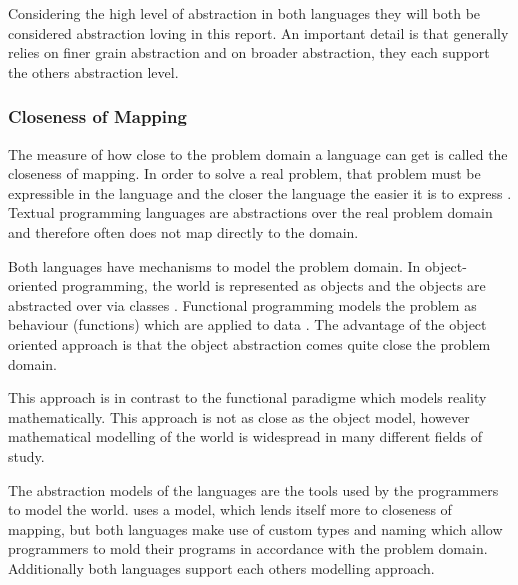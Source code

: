 Considering the high level of abstraction in both languages they will both be considered abstraction loving in this report. An important detail is that \fs generally relies on finer grain abstraction and \cs on broader abstraction, they each support the others abstraction level.

\subsubsection{Closeness of Mapping}
The measure of how close to the problem domain a language can get is called the closeness of mapping. In order to solve a real problem, that problem must be expressible in the language and the closer the language the easier it is to express \cite{green1996usability}. Textual programming languages are abstractions over the real problem domain and therefore often does not map directly to the domain.

Both languages have mechanisms to model the problem domain. In object-oriented programming, the world is represented as objects and the objects are abstracted over via classes \cite{kindler2011object}. Functional programming models the problem as behaviour (functions) which are applied to data \cite{hughes1989functional}. The advantage of the object oriented approach is that the object abstraction comes quite close the problem domain.


This approach is in contrast to the functional paradigme which models reality mathematically. This approach is not as close as the object model, however mathematical modelling of the world is widespread in many different fields of study.


The abstraction models of the languages are the tools used by the programmers to model the world. \cs uses a model, which lends itself more to closeness of mapping, but both languages make use of custom types and naming which allow programmers to mold their programs in accordance with the problem domain. Additionally both languages support each others modelling approach.

